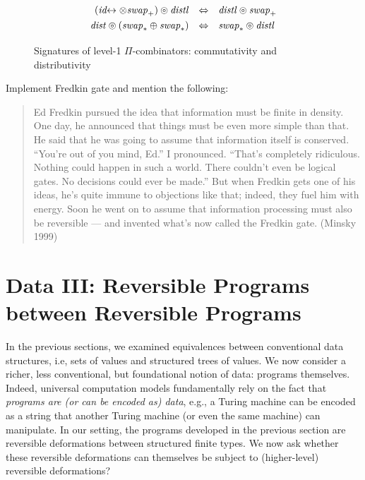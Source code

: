 \documentclass{article}
\newcommand{\swapp}{\mathit{swap}_+}
\newcommand{\swapt}{\mathit{swap}_*}
\newcommand{\dist}{\mathit{dist}}
\newcommand{\distl}{\mathit{distl}}
\newcommand{\idc}{\mathit{id}\!\!\leftrightarrow}
\begin{document}
\begin{figure}[t]
\[\def\arraystretch{1.3}
\begin{array}{rcl}
  (\idc \otimes \swapp) \circledcirc \distl &\Leftrightarrow& \distl \circledcirc \swapp
\\
  \dist \circledcirc (\swapt \oplus \swapt) &\Leftrightarrow & \swapt \circledcirc \distl
\end{array}\]
\caption{\label{figa}Signatures of level-1 $\Pi$-combinators: commutativity and distributivity}
\end{figure}

Implement Fredkin gate and mention the following:

\begin{quote}
  Ed Fredkin pursued the idea that information must be finite in
  density. One day, he announced that things must be even more simple
  than that. He said that he was going to assume that information
  itself is conserved. “You’re out of you mind, Ed.” I
  pronounced. “That’s completely ridiculous. Nothing could happen in
  such a world. There couldn’t even be logical gates. No decisions
  could ever be made.” But when Fredkin gets one of his ideas, he’s
  quite immune to objections like that; indeed, they fuel him with
  energy. Soon he went on to assume that information processing must
  also be reversible — and invented what’s now called the Fredkin
  gate. (Minsky 1999)
\end{quote}

\section{Data III: Reversible Programs between Reversible Programs}

In the previous sections, we examined equivalences between
conventional data structures, i.e, sets of values and structured trees
of values. We now consider a richer, less conventional, but
foundational notion of data: programs themselves. Indeed, universal
computation models fundamentally rely on the fact that \emph{programs
  are (or can be encoded as) data}, e.g., a Turing machine can be
encoded as a string that another Turing machine (or even the same
machine) can manipulate. In our setting, the programs developed in the
previous section are reversible deformations between structured finite
types. We now ask whether these reversible deformations can themselves
be subject to (higher-level) reversible deformations?
\end{document}
